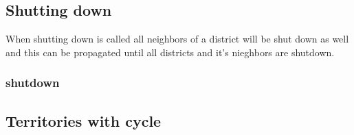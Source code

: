\documentclass[12pt,a4paper]{article}
\begin{document}
\subsection{Shutting down}
When shutting down is called all neighbors of a district will be shut down as well and this can be propagated until all districts and it's nieghbors are shutdown.

\subsubsection{shutdown}

\subsection{Territories with cycle}



\end{document}
